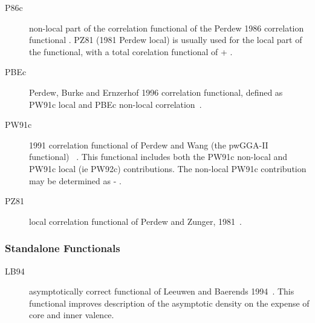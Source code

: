 \begin{description}
\begin{description}
\item[P86c] non-local part of the correlation functional of the Perdew 1986 correlation functional
  \cite{dft:p86}. PZ81 (1981 Perdew local) is usually used for the local part of the
  functional, with a total corelation functional of 
   + .

\item[PBEc] Perdew, Burke and Ernzerhof 1996 correlation functional, 
  defined as PW91c local and PBEc non-local correlation~\cite{dft:pbe}.

\item[PW91c] 1991 correlation functional of Perdew and Wang (the pwGGA-II functional)
  ~\cite{dft:pw91}. This functional includes both the PW91c non-local and 
  PW91c local (ie PW92c) contributions. The non-local PW91c contribution may be determined
  as  - .



\item[PZ81] local correlation functional of Perdew and Zunger, 1981~\cite{dft:pz81}.



\end{description}

\subsubsection{Standalone Functionals}
\providecommand\onefn[1]{#1}
\begin{description}
\item[LB94] asymptotically correct functional of Leeuwen and
  Baerends 1994~\cite{dft:lb94}. This functional improves description of the
  asymptotic density on the expense of core and inner valence.


\end{description}
\end{description}
